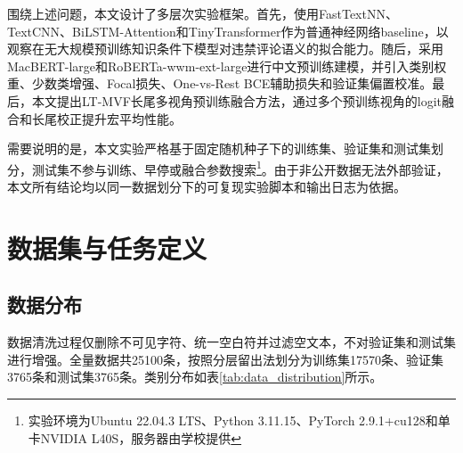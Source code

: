 \documentclass[UTF8, fontset=windows]{ctexart}
\begin{document}
	围绕上述问题，本文设计了多层次实验框架。首先，使用FastTextNN、TextCNN、BiLSTM-Attention和TinyTransformer作为普通神经网络baseline，以观察在无大规模预训练知识条件下模型对违禁评论语义的拟合能力。随后，采用MacBERT-large和RoBERTa-wwm-ext-large进行中文预训练建模，并引入类别权重、少数类增强、Focal损失、One-vs-Rest BCE辅助损失和验证集偏置校准。最后，本文提出LT-MVF长尾多视角预训练融合方法，通过多个预训练视角的logit融合和长尾校正提升宏平均性能。
	
	需要说明的是，本文实验严格基于固定随机种子下的训练集、验证集和测试集划分，测试集不参与训练、早停或融合参数搜索\footnote{实验环境为Ubuntu 22.04.3 LTS、Python 3.11.15、PyTorch 2.9.1+cu128和单卡NVIDIA L40S，服务器由学校提供}。由于非公开数据无法外部验证，本文所有结论均以同一数据划分下的可复现实验脚本和输出日志为依据。
	
	\section{数据集与任务定义}
	
	\subsection{数据分布}
	
	数据清洗过程仅删除不可见字符、统一空白符并过滤空文本，不对验证集和测试集进行增强。全量数据共25100条，按照分层留出法划分为训练集17570条、验证集3765条和测试集3765条。类别分布如表\ref{tab:data_distribution}所示。
	
	\begin{table}[htbp]
		\centering
		\caption{数据集类别分布}
		\label{tab:data_distribution}
	\end{table}
	
\end{document}

